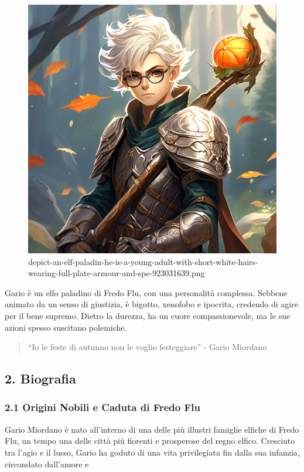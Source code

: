 \begin{figure}
\centering
\includegraphics{depict-an-elf-paladin-he-is-a-young-adult-with-short-white-hairs-wearing-full-plate-armour-and-spe-923031639.png}
\caption{depict-an-elf-paladin-he-is-a-young-adult-with-short-white-hairs-wearing-full-plate-armour-and-spe-923031639.png}
\end{figure}

Gario è un elfo paladino di Fredo Flu, con una personalità complessa.
Sebbene animato da un senso di giustizia, è bigotto, xenofobo e
ipocrita, credendo di agire per il bene supremo. Dietro la durezza, ha
un cuore compassionevole, ma le sue azioni spesso suscitano polemiche.

\begin{quote}
``Io le feste di autunno non le voglio festeggiare'' - Gario Miordano
\end{quote}

\subsection{2. Biografia}\label{biografia}


\subsubsection{\texorpdfstring{\textbf{2.1 Origini Nobili e Caduta di
Fredo
Flu}}{2.1 Origini Nobili e Caduta di Fredo Flu}}\label{origini-nobili-e-caduta-di-fredo-flu}

Gario Miordano è nato all'interno di una delle più illustri famiglie
elfiche di Fredo Flu, un tempo una delle città più fiorenti e prosperose
del regno elfico. Cresciuto tra l'agio e il lusso, Gario ha goduto di
una vita privilegiata fin dalla sua infanzia, circondato dall'amore e
